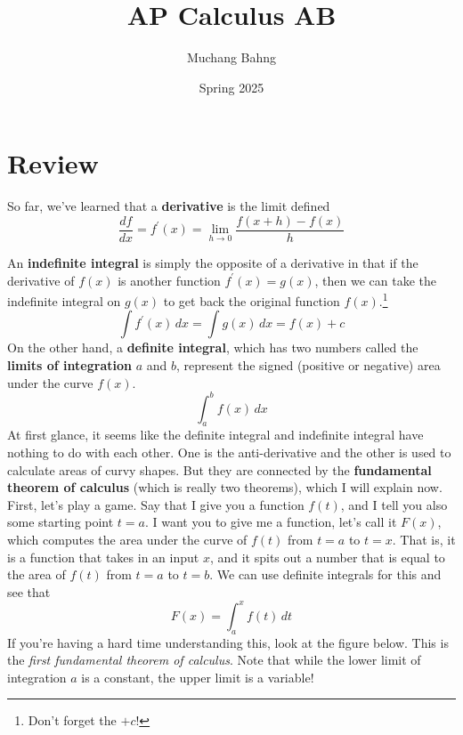 \documentclass{article}
\begin{document}
\title{AP Calculus AB}
\author{Muchang Bahng}
\date{Spring 2025}

\maketitle

\section{Review}

  So far, we've learned that a \textbf{derivative} is the limit defined 
  \begin{equation}
    \frac{df}{dx} = f^\prime (x) = \lim_{h \rightarrow 0} \frac{f(x + h) - f(x)}{h}
  \end{equation}

  An \textbf{indefinite integral} is simply the opposite of a derivative in that if the derivative of $f(x)$ is another function $f^\prime (x) = g(x)$, then we can take the indefinite integral on $g(x)$ to get back the original function $f(x)$.\footnote{Don't forget the $+c$!}
  \begin{equation}
    \int f^\prime (x) \,dx = \int g(x) \,dx = f(x) + c 
  \end{equation}
  On the other hand, a \textbf{definite integral}, which has two numbers called the \textbf{limits of integration} $a$ and $b$, represent the signed (positive or negative) area under the curve $f(x)$. 
  \begin{equation}
    \int_a^b f(x) \,dx
  \end{equation}
  At first glance, it seems like the definite integral and indefinite integral have nothing to do with each other. One is the anti-derivative and the other is used to calculate areas of curvy shapes. But they are connected by the \textbf{fundamental theorem of calculus} (which is really two theorems), which I will explain now. First, let's play a game. Say that I give you a function $f(t)$, and I tell you also some starting point $t=a$. I want you to give me a function, let's call it $F(x)$, which computes the area under the curve of $f(t)$ from $t=a$ to $t=x$. That is, it is a function that takes in an input $x$, and it spits out a number that is equal to the area of $f(t)$ from $t=a$ to $t=b$. We can use definite integrals for this and see that 
  \begin{equation}
    F(x) = \int_a^x f(t)\,dt
  \end{equation}
  If you're having a hard time understanding this, look at the figure below. This is the \textit{first fundamental theorem of calculus}. Note that while the lower limit of integration $a$ is a constant, the upper limit is a variable! 
\end{document}
